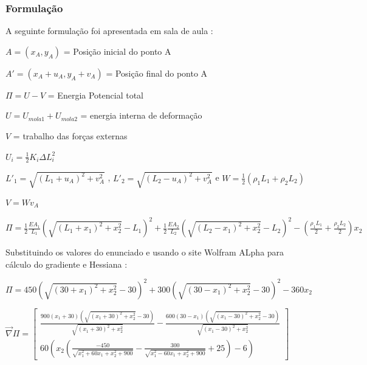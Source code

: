 \documentclass[10pt, a4paper]{article}
\begin{document}
\subsubsection{Formulação}
A seguinte formulação foi apresentada em sala de aula :
\vspace{3mm}

$A = (x_A, y_A)$ = Posição inicial do ponto A

\vspace{3mm}
$A' = (x_A + u_A, y_A + v_A)$ = Posição final do ponto A

\vspace{3mm}
$\Pi = U - V$ = Energia Potencial total

\vspace{3mm}
$U = U_{mola1} + U_{mola2}$ = energia interna de deformação

\vspace{3mm}
$V$ = trabalho das forças externas

\vspace{5mm}
$U_i = \frac{1}{2}K_i\Delta L_i^2$

\vspace{3mm}
$L'_1 = \sqrt{(L_1 + u_A)^2 + v_A^2}$ , $L'_2 = \sqrt{(L_2 - u_A)^2 + v_A^2}$ e $W = \frac{1}{2}(\rho_1L_1 + \rho_2L_2)$

\vspace{3mm}
$V = Wv_A$

\vspace{5mm}
$\Pi = \frac{1}{2}\frac{EA_1}{L_1}(\sqrt{(L_1 + x_1)^2 + x_2^2} - L_1)^2 +
        \frac{1}{2}\frac{EA_2}{L_2}(\sqrt{(L_2 - x_1)^2 + x_2^2} - L_2)^2 - 
        (\frac{\rho_1L_1}{2} + \frac{\rho_2L_2}{2})x_2$

\vspace{3mm}
Substituindo os valores do enunciado e usando o site Wolfram ALpha para cálculo do gradiente e Hessiana :

\vspace{3mm}
$\Pi = 450(\sqrt{(30 + x_1)^2 + x_2^2} - 30)^2 +
        300(\sqrt{(30 - x_1)^2 + x_2^2} - 30)^2 - 
        360x_2$

\vspace{3mm}

 $\overrightarrow{\nabla}\Pi =
\begin{bmatrix}
  \frac{900 (x_1 + 30) (\sqrt{(x_1 + 30)^2 + x_2^2} - 30)}{\sqrt{(x_1 + 30)^2 + x_2^2}} - 
  \frac{600 (30 - x_1) (\sqrt{(x_1 - 30)^2 + x_2^2} - 30)}{\sqrt{(x_1 - 30)^2 + x_2^2}} \\[5mm]
  60 (x_2 (\frac{-450}{\sqrt{x_1^2 + 60 x_1 + x_2^2 + 900}} - \frac{300}{\sqrt{x_1^2 - 60 x_1 + x_2^2 + 900}} + 25) - 6)
\end{bmatrix}$
\end{document}
